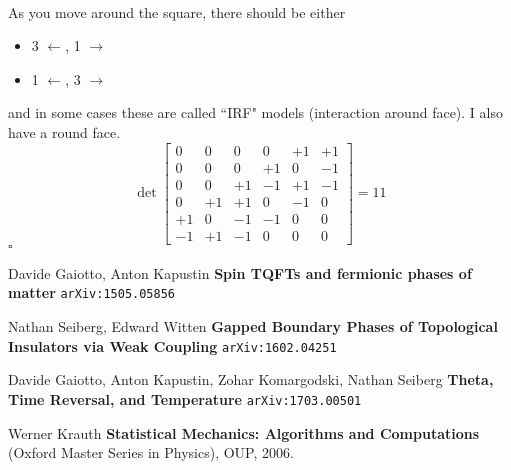 \documentclass[12pt]{article}
\begin{document}
 \\
As you move around the square, there should be either
\begin{itemize}
\item 3 $\leftarrow$, 1 $\rightarrow$
\item 1 $\leftarrow$, 3 $\rightarrow$
\end{itemize}
and in some cases these are called ``IRF" models (interaction around face).  I also have a round face.
$$ \det \left[
\begin{array}{rrrrrrr}
0 & 0& 0& 0& +1& +1\\
0 & 0 & 0 & +1 & 0 & -1 \\
0 & 0 & +1 & -1 & +1 & -1 \\
0 & +1 & +1 & 0 & -1 & 0  \\
+1 & 0 & -1 & -1 & 0 & 0 \\
-1 & +1 & -1 & 0 & 0 & 0
\end{array}
 \right] = 11 $$
\hfill $\square$

\newpage

\selectfont \fontsize{12}{10}\selectfont

\begin{thebibliography}{}

\item Davide Gaiotto, Anton Kapustin \textbf{Spin TQFTs and fermionic phases of matter} \texttt{arXiv:1505.05856}

\item Nathan Seiberg, Edward Witten \textbf{Gapped Boundary Phases of Topological Insulators via Weak Coupling}   \texttt{arXiv:1602.04251}

\item Davide Gaiotto, Anton Kapustin, Zohar Komargodski, Nathan Seiberg \textbf{Theta, Time Reversal, and Temperature} \texttt{arXiv:1703.00501}

\item Werner Krauth \textbf{Statistical Mechanics: Algorithms and Computations} (Oxford Master Series in Physics), OUP, 2006.

\end{thebibliography} 
\end{document}
